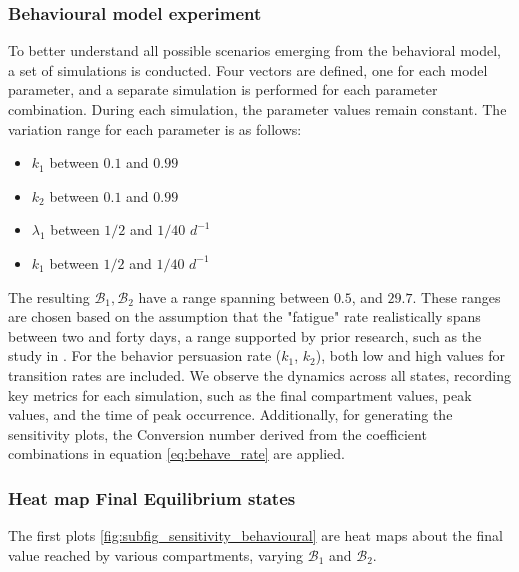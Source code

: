 \subsubsection{Behavioural model experiment}
To better understand all possible scenarios emerging from the behavioral model, a set of simulations is conducted. Four vectors are defined, one for each model parameter, and a separate simulation is performed for each parameter combination. During each simulation, the parameter values remain constant. The variation range for each parameter is as follows:
\begin{itemize}
	\item $k_1$ between $0.1$ and $0.99$
	\item $k_2$ between $0.1$ and $0.99$
	\item $\lambda_1$ between $1/2$ and $1/40$ $d^{-1}$
	\item $k_1$ between $1/2$ and $1/40$ $d^{-1}$
\end{itemize}
The resulting $\mathcal{B}_1, \mathcal{B}_2$ have a range spanning between $0.5$, and $29.7$.
These ranges are chosen based on the assumption that the "fatigue" rate realistically spans between two and forty days, a range supported by prior research, such as the study in \cite{Kwasnicka_2016}. For the behavior persuasion rate ($k_1$, $k_2$), both low and high values for transition rates are included. We observe the dynamics across all states, recording key metrics for each simulation, such as the final compartment values, peak values, and the time of peak occurrence. Additionally, for generating the sensitivity plots, the Conversion number derived from the coefficient combinations in equation \eqref{eq:behave_rate} are applied. 
\subsubsection{Heat map Final Equilibrium states}
The first plots \ref{fig:subfig_sensitivity_behavioural} are heat maps about the final value reached by various compartments, varying $\mathcal{B}_1$ and $\mathcal{B}_2$.

